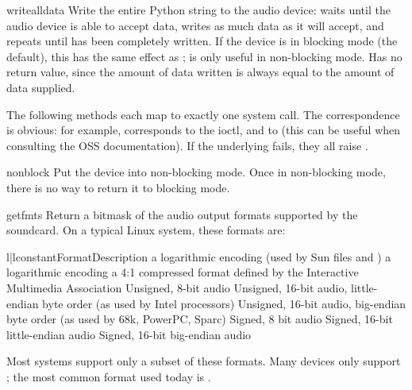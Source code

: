 \begin{methoddesc}{writeall}{data}
Write the entire Python string  to the audio device: waits
until the audio device is able to accept data, writes as much data as it
will accept, and repeats until  has been completely written.
If the device is in blocking mode (the default), this has the same
effect as ;  is only useful in
non-blocking mode.  Has no return value, since the amount of data
written is always equal to the amount of data supplied.
\end{methoddesc}

The following methods each map to exactly one
 system call.  The correspondence is obvious: for
example,  corresponds to the 
ioctl, and  to  (this can be useful
when consulting the OSS documentation).  If the underlying
 fails, they all raise .

\begin{methoddesc}{nonblock}{}
Put the device into non-blocking mode.  Once in non-blocking mode, there
is no way to return it to blocking mode.
\end{methoddesc}

\begin{methoddesc}{getfmts}{}
Return a bitmask of the audio output formats supported by the
soundcard.  On a typical Linux system, these formats are:

\begin{tableii}{l|l}{constant}{Format}{Description}
       {a logarithmic encoding (used by Sun  files and
        )}
       {a logarithmic encoding}
       {a 4:1 compressed format defined by the Interactive Multimedia
        Association} 
       {Unsigned, 8-bit audio}
       {Unsigned, 16-bit audio, little-endian byte order (as used by
        Intel processors)}
       {Unsigned, 16-bit audio, big-endian byte order (as used by 68k,
        PowerPC, Sparc)}
       {Signed, 8 bit audio}
       {Signed, 16-bit little-endian audio}
       {Signed, 16-bit big-endian audio}
\end{tableii}
Most systems support only a subset of these formats.  Many devices only
support ; the most common format used today is
.
\end{methoddesc}

